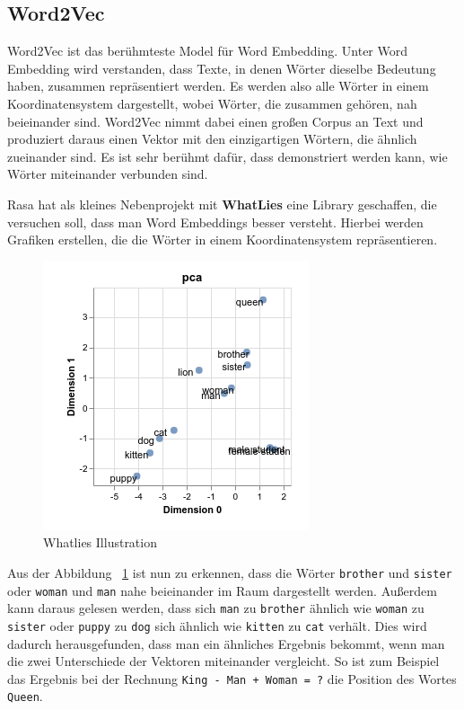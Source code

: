 \subsection{Word2Vec}

Word2Vec ist das berühmteste Model für Word Embedding.
Unter Word Embedding wird verstanden, dass Texte, in denen Wörter dieselbe Bedeutung haben, zusammen repräsentiert werden.
Es werden also alle Wörter in einem Koordinatensystem dargestellt, wobei Wörter, die zusammen gehören, nah beieinander sind.
Word2Vec nimmt dabei einen großen Corpus an Text und produziert daraus einen Vektor mit den einzigartigen Wörtern, die ähnlich zueinander sind.
Es ist sehr berühmt dafür, dass demonstriert werden kann, wie Wörter miteinander verbunden sind.

Rasa hat als kleines Nebenprojekt mit \textbf{WhatLies} eine Library geschaffen, die versuchen soll, dass man Word Embeddings besser versteht.
Hierbei werden Grafiken erstellen, die die Wörter in einem Koordinatensystem repräsentieren.\cite{whatlies}

\begin{figure}[hbt!]
    \centering
    \includegraphics[scale=1]{pics/whatlies_demo}
    \caption{Whatlies Illustration~\cite{whatlies}}
    \label{fig:whatlies-demo}
\end{figure}

Aus der Abbildung ~\ref{fig:whatlies-demo} ist nun zu erkennen, dass die Wörter \texttt{brother} und \texttt{sister} oder \texttt{woman} und \texttt{man} nahe beieinander im Raum dargestellt werden.
Außerdem kann daraus gelesen werden, dass sich \texttt{man} zu \texttt{brother} ähnlich wie \texttt{woman} zu \texttt{sister} oder \texttt{puppy} zu \texttt{dog} sich ähnlich wie \texttt{kitten} zu \texttt{cat} verhält.
Dies wird dadurch herausgefunden, dass man ein ähnliches Ergebnis bekommt, wenn man die zwei Unterschiede der Vektoren miteinander vergleicht.
So ist zum Beispiel das Ergebnis bei der Rechnung \texttt{King - Man + Woman = ?} die Position des Wortes \texttt{Queen}.

